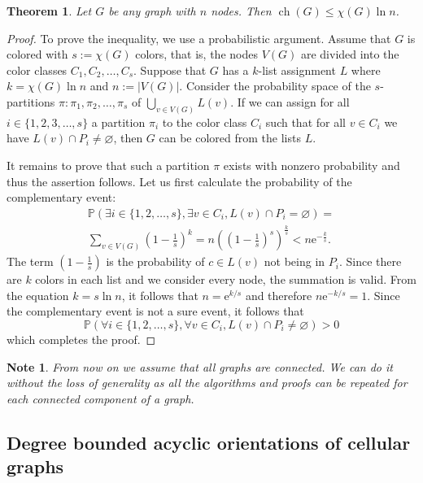 \documentclass[a4paper, 12pt]{article}
\newtheorem{theo}[lem]{Theorem}
\newtheorem{note}[lem]{Note}
\DeclareMathOperator*{\ch}{ch}
\begin{document}
\begin{theo}\label{theo:logarithm-bound}
Let $G$ be any graph with $n$ nodes. Then $\ch(G) \leqslant \chi(G) \ln{n}$.
\end{theo}
\begin{proof} To prove the inequality, we use a probabilistic argument. Assume that $G$ is colored with $s := \chi(G)$ colors, that is, the nodes $V(G)$ are divided into the color classes $C_1, C_2, \ldots, C_s$. Suppose that $G$ has a $k$-list assignment $L$ where $k = \chi(G) \ln{n}$ and $n := |V(G)|.$ Consider the probability space of the $s$-partitions $\pi \colon \pi_{1},\pi_{2},\ldots,\pi_{s}$ of $\bigcup_{v \in V(G)} L(v).$ If we can assign for all $i \in \lbrace 1,2,3,\dots,s \rbrace$ a partition $\pi_i$ to the color class $C_i$ such that for all $v \in C_i$ we have $L(v) \cap P_i \neq \varnothing$, then $G$ can be colored from the lists $L$. 

It remains to prove that such a partition $\pi$ exists with nonzero probability and thus the assertion follows. Let us first calculate the probability of the complementary event:
\begin{equation*}
\begin{split}
\mathbb{P}(\exists i \in \lbrace 1,2,\ldots, s \rbrace, \exists v \in C_i, L(v) \cap P_i = \varnothing) = \\
\sum_{v \in V(G)}\left( 1 - \frac{1}{s} \right)^k = n \left(\left(1 - \frac{1}{s} \right)^s \right)^{\frac{k}{s}} < n\mathrm{e}^{-\frac{k}{s}}.
\end{split}
\end{equation*}
The term $\left( 1 - \frac{1}{s} \right)$ is the probability of $c \in L(v)$ not being in $P_i.$ Since there are $k$ colors in each list and we consider every node, the summation is valid. From the equation $k = s \ln{n}$, it follows that $n = \mathrm{e}^{k/s}$ and therefore $n\mathrm{e}^{-k/s} = 1.$ Since the complementary event is not a sure event, it follows that
$$
\mathbb{P}(\forall i \in \lbrace 1,2,\ldots, s \rbrace, \forall v \in C_i, L(v) \cap P_i \neq \varnothing) > 0
$$
which completes the proof.
\end{proof}
\begin{note}From now on we assume that all graphs are connected. We can do it without the loss of generality as all the algorithms and proofs can be repeated for each connected component of a graph.\end{note}

\subsection{Degree bounded acyclic orientations of cellular graphs}\label{sec:orientation}
\end{document}
